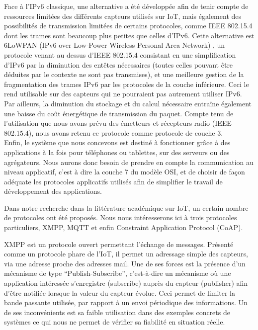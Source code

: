 \documentclass{article}
\begin{document}
Face à l’IPv6 classique, une alternative a été développée afin de tenir compte de ressources limitées des différents capteurs utilisés sur IoT, mais également des possibilités de transmission limitées de certains protocoles, comme IEEE 802.15.4 dont les trames sont beaucoup plus petites que celles d’IPv6. Cette alternative est 6LoWPAN (IPv6 over Low-Power Wireless Personal Area Network) \cite{6LoWPAN}, un protocole venant au dessus d’IEEE 802.15.4 consistant en une simplification d’IPv6 par la diminution des entêtes nécessaires (toutes celles pouvant être déduites par le contexte ne sont pas transmises), et une meilleure gestion de la fragmentation des trames IPv6 par les protocoles de la couche inférieure. Ceci le rend utilisable sur des capteurs qui ne pourraient pas autrement utiliser IPv6. Par ailleurs, la diminution du stockage et du calcul nécessaire entraîne également une baisse du coût énergétique de transmission du paquet. Compte tenu de l’utilisation que nous avons prévu des émetteurs et récepteurs radio (IEEE 802.15.4), nous avons retenu ce protocole comme protocole de couche 3.
\\

Enfin, le système que nous concevons est destiné à fonctionner grâce à des applications à la fois pour téléphones ou tablettes, sur des serveurs ou des agrégateurs. Nous aurons donc besoin de prendre en compte la communication au niveau applicatif, c’est à dire la couche 7 du modèle OSI, et de choisir de façon adéquate les protocoles applicatifs utilisés afin de simplifier le travail de développement des applications.

Dans notre recherche dans la littérature académique sur IoT, un certain nombre de protocoles ont été proposés. Nous nous intéresserons ici à trois protocoles particuliers, XMPP, MQTT et enfin Constraint Application Protocol (CoAP).

XMPP \cite{kirsche2012unify} est un protocole ouvert permettant l’échange de messages. Présenté comme un protocole phare de l’IoT, il permet un adressage simple des capteurs, via une adresse proche des adresses mail. Une de ses forces est la présence d’un mécanisme de type “Publish-Subscribe”, c’est-à-dire un mécanisme où une application intéressée s’enregistre (subscribe) auprès du capteur (publisher) afin d’être notifiée lorsque la valeur du capteur évolue. Ceci permet de limiter la bande passante utilisée, par rapport à un envoi périodique des informations. Un de ses inconvénients est sa faible utilisation dans des exemples concrets de systèmes ce qui nous ne permet de vérifier sa fiabilité en situation réelle.
\end{document}
